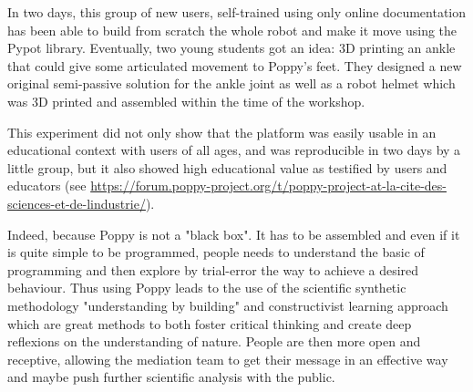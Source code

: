 In two days, this group of new users, self-trained using only online documentation has been able to build from scratch the whole robot and make it move using the Pypot library. Eventually, two young students got an idea: 3D printing an ankle that could give some articulated movement to Poppy's feet. They designed a new original semi-passive solution for the ankle joint as well as a robot helmet which was 3D printed and assembled within the time of the workshop.

\begin{figure}[]
\centering
    \hfil
    \hfil
    \caption{}
    \label{fig:universience_conception}
\end{figure}

This experiment did not only show that the platform was easily usable in an educational context with users of all ages, and was reproducible in two days by a little group, but it also showed high educational value as testified by users and educators (see \url{https://forum.poppy-project.org/t/poppy-project-at-la-cite-des-sciences-et-de-lindustrie/}).

\begin{figure}[h]
\centering
    \hfil
    \newline
    \hfil
    \caption{}
    \label{fig:universience_assembly}
\end{figure}

Indeed, because Poppy is not a "black box". It has to be assembled and even if it is quite simple to be programmed, people needs to understand the basic of programming and then explore by trial-error the way to achieve a desired behaviour. Thus using Poppy leads to the use of the scientific synthetic methodology "understanding by building" and constructivist learning approach which are great methods to both foster critical thinking and create deep reflexions on the understanding of nature. People are then more open and receptive, allowing the mediation team to get their message in an effective way and maybe push further scientific analysis with the public.

